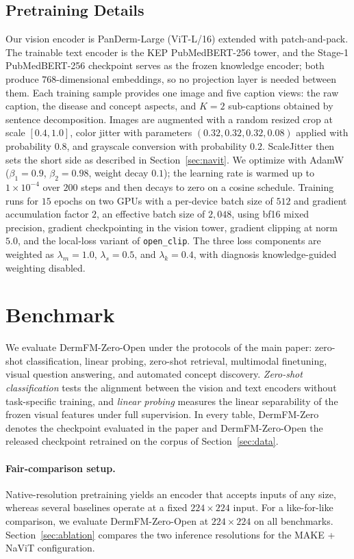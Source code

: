 \documentclass{article}
\begin{document}
\subsection{Pretraining Details}
\label{sec:implementation}
Our vision encoder is PanDerm-Large (ViT-L/16) extended with patch-and-pack. The trainable text encoder is the KEP PubMedBERT-256 tower, and the Stage-1 PubMedBERT-256 checkpoint serves as the frozen knowledge encoder; both produce $768$-dimensional embeddings, so no projection layer is needed between them. Each training sample provides one image and five caption views: the raw caption, the disease and concept aspects, and $K{=}2$ sub-captions obtained by sentence decomposition. Images are augmented with a random resized crop at scale $[0.4, 1.0]$, color jitter with parameters $(0.32, 0.32, 0.32, 0.08)$ applied with probability $0.8$, and grayscale conversion with probability $0.2$. ScaleJitter then sets the short side as described in Section~\ref{sec:navit}. We optimize with AdamW ($\beta_1{=}0.9$, $\beta_2{=}0.98$, weight decay $0.1$); the learning rate is warmed up to $1\!\times\!10^{-4}$ over $200$ steps and then decays to zero on a cosine schedule. Training runs for $15$ epochs on two GPUs with a per-device batch size of $512$ and gradient accumulation factor $2$, an effective batch size of $2{,}048$, using bf16 mixed precision, gradient checkpointing in the vision tower, gradient clipping at norm $5.0$, and the local-loss variant of \texttt{open\_clip}. The three loss components are weighted as $\lambda_m{=}1.0$, $\lambda_s{=}0.5$, and $\lambda_k{=}0.4$, with diagnosis knowledge-guided weighting disabled.

\section{Benchmark}
\label{sec:benchmark}

We evaluate DermFM-Zero-Open under the protocols of the main paper: zero-shot classification, linear probing, zero-shot retrieval, multimodal finetuning, visual question answering, and automated concept discovery. \emph{Zero-shot classification} tests the alignment between the vision and text encoders without task-specific training, and \emph{linear probing} measures the linear separability of the frozen visual features under full supervision. In every table, DermFM-Zero denotes the checkpoint evaluated in the paper and DermFM-Zero-Open the released checkpoint retrained on the corpus of Section~\ref{sec:data}.

\paragraph{Fair-comparison setup.}
Native-resolution pretraining yields an encoder that accepts inputs of any size, whereas several baselines operate at a fixed $224\times224$ input. For a like-for-like comparison, we evaluate DermFM-Zero-Open at $224\times224$ on all benchmarks. Section~\ref{sec:ablation} compares the two inference resolutions for the MAKE + NaViT configuration.
\end{document}
